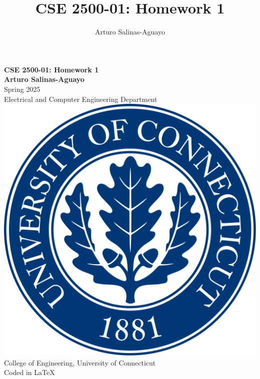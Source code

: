 \documentclass[12pt]{article}
\author{Arturo Salinas-Aguayo}
\title{CSE 2500-01: Homework 1}
\begin{document}
\newcommand{\closure}[2][3]{%
	{}\mkern#1mu\overline{\mkern-#1mu#2}}
\newcommand\ncoverline[1]{\mkern1mu\overline{\mkern-1mu#1\mkern-1mu}\mkern1mu}
\begin{titlepage}
	\centering
	\vspace*{3cm}
	\huge\textbf{CSE 2500-01: Homework 1}\\
	\vspace{5cm}
	\Large\textbf{Arturo Salinas-Aguayo}\\
	\normalsize
	Spring 2025\\
	Electrical and Computer Engineering Department\\
	\vfill
	\includegraphics[scale=0.1]{uconnlogo}\\
	College of Engineering, University of Connecticut\\
	\scriptsize{Coded in \LaTeX}
	\vspace*{1cm}
\end{titlepage}
\end{document}
